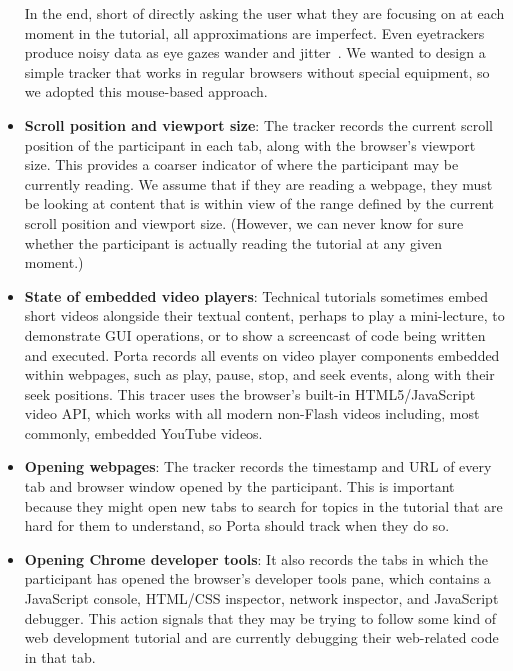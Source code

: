 \begin{itemize}
        In the end, short of directly asking the user what they are
        focusing on at each moment in the tutorial, all approximations
        are imperfect. Even eyetrackers produce noisy data as eye gazes
        wander and jitter~\cite{tobii2011}. We wanted to design a simple tracker that
        works in regular browsers without special equipment, so we
        adopted this mouse-based approach.

        \item \textbf{Scroll position and viewport size}: The tracker
        records the current scroll position of the participant in each
        tab, along with the browser's viewport size. This provides a
        coarser indicator of where the participant may be currently
        reading. We assume that if they are reading a webpage, they
        must be looking at content that is within view of the range
        defined by the current scroll position and viewport size.
        (However, we can never know for sure whether the participant is
        actually reading the tutorial at any given moment.)

        \item \textbf{State of embedded video players}: Technical
        tutorials sometimes embed short videos alongside their textual
        content, perhaps to play a mini-lecture, to demonstrate GUI
        operations, or to show a screencast of code being written and
        executed. Porta
        records all events on video player components embedded within
        webpages, such as play, pause, stop, and seek events, along with
        their seek positions. This tracer uses the browser's built-in
        HTML5/JavaScript video API, which works with all modern
        non-Flash videos including, most commonly, embedded YouTube videos.
       
        \item \textbf{Opening webpages}: The tracker records
        the timestamp and URL of every tab and browser window opened by
        the participant. This is important because they might open new
        tabs to search for topics in the tutorial that are hard for them
        to understand, so Porta should track when they do so.

        \item \textbf{Opening Chrome developer tools}: It also records
        the tabs in which the participant has opened the browser's
        developer tools pane, which contains a JavaScript console,
        HTML/CSS inspector, network inspector, and JavaScript debugger.
        This action signals that they may be trying to follow some kind
        of web development tutorial and are currently debugging their
        web-related code in that tab.


\end{itemize}
